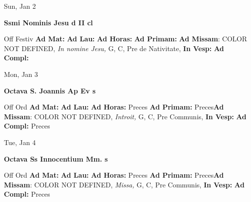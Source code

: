 \documentclass[10pt]{memoir}
\begin{document}
\begin{center}
\begin{minipage}{3.5in}
\vspace{2em}
\begin{center}Sun, Jan 2
\end{center}
\textbf{ \large Ssmi Nominis Jesu
\textnormal{\normalsize d II cl}}

\begin{justify}Off Festiv
\textbf{Ad Mat: }
\textbf{Ad Lau: }
\textbf{Ad Horas: }
\textbf{Ad Primam: }\textbf{Ad Missam}: COLOR NOT DEFINED, \textit{In nomine Jesu,} G, C, Pre de Nativitate, 
\textbf{In Vesp: }
\textbf{Ad Compl: }
\end{justify}
\end{minipage}
\end{center}

\begin{center}
\begin{minipage}{3.5in}
\vspace{2em}
\begin{center}Mon, Jan 3
\end{center}
\textbf{ \large Octava S. Joannis Ap Ev
\textnormal{\normalsize s}}

\begin{justify}Off Ord
\textbf{Ad Mat: }
\textbf{Ad Lau: }
\textbf{Ad Horas: }Preces
\textbf{Ad Primam: }Preces\textbf{Ad Missam}: COLOR NOT DEFINED, \textit{Introit,} G, C, Pre Communis, 
\textbf{In Vesp: }
\textbf{Ad Compl: }Preces
\end{justify}
\end{minipage}
\end{center}

\begin{center}
\begin{minipage}{3.5in}
\vspace{2em}
\begin{center}Tue, Jan 4
\end{center}
\textbf{ \large Octava Ss Innocentium Mm.
\textnormal{\normalsize s}}

\begin{justify}Off Ord
\textbf{Ad Mat: }
\textbf{Ad Lau: }
\textbf{Ad Horas: }Preces
\textbf{Ad Primam: }Preces\textbf{Ad Missam}: COLOR NOT DEFINED, \textit{Missa,} G, C, Pre Communis, 
\textbf{In Vesp: }
\textbf{Ad Compl: }Preces
\end{justify}
\end{minipage}
\end{center}
\end{document}
